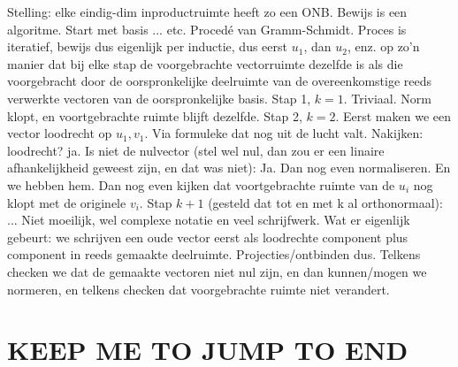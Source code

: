 \documentclass{article}
\begin{document}
Stelling: elke eindig-dim inproductruimte heeft zo een ONB. 
Bewijs is een algoritme. Start met basis ... etc. Proced\'e van Gramm-Schmidt. Proces is iteratief, bewijs dus eigenlijk per inductie, dus eerst $u_1$, dan $u_2$, enz. op zo'n manier dat bij elke stap de voorgebrachte vectorruimte dezelfde is als die voorgebracht door de oorspronkelijke deelruimte van de overeenkomstige reeds verwerkte vectoren van de oorspronkelijke basis. 
Stap 1, $k=1$. Triviaal. Norm klopt, en voortgebrachte ruimte blijft dezelfde. 
Stap 2, $k=2$. Eerst maken we een vector loodrecht op $u_1,v_1$. Via formuleke dat nog uit de lucht valt. Nakijken: loodrecht? ja. Is niet de nulvector (stel wel nul, dan zou er een linaire afhankelijkheid geweest zijn, en dat was niet): Ja. Dan nog even normaliseren. En we hebben hem. Dan nog even kijken dat voortgebrachte ruimte van de $u_i$ nog klopt met de originele $v_i$. 
Stap $k+1$ (gesteld dat tot en met k al orthonormaal): ... 
Niet moeilijk, wel complexe notatie en veel schrijfwerk. Wat er eigenlijk gebeurt: we schrijven een oude vector eerst als loodrechte component plus component in reeds gemaakte deelruimte. Projecties/ontbinden dus. Telkens checken we dat de gemaakte vectoren niet nul zijn, en dan kunnen/mogen we normeren, en telkens checken dat voorgebrachte ruimte niet verandert.  




\section*{KEEP ME TO JUMP TO END}
\end{document}
